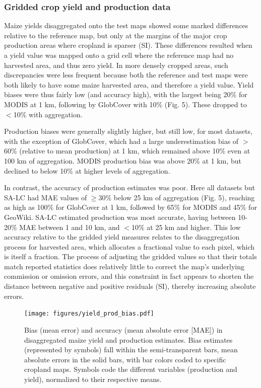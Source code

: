 \documentclass[a4paper]{article}
\begin{document}
\subsubsection*{Gridded crop yield and production data}
Maize yields disaggregated onto the test maps showed some marked differences relative to the reference map, but only at the margins of the major crop production areas where cropland is sparser (SI). These differences resulted when a yield value was mapped onto a grid cell where the reference map had no harvested area, and thus zero yield. In more densely cropped areas, such discrepancies were less frequent because both the reference and test maps were both likely to have some maize harvested area, and therefore a yield value.  Yield biases were thus fairly low (and accuracy high), with the largest being 20\% for MODIS at 1 km, following by GlobCover with 10\% (Fig. 5). These dropped to $<$10\% with aggregation.  

Production biases were generally slightly higher, but still low, for most datasets, with the exception of GlobCover, which had a large underestimation bias of $>$60\% (relative to mean production) at 1 km, which remained above 10\% even at 100 km of aggregation. MODIS production bias was above 20\% at 1 km, but declined to below 10\% at higher levels of aggregation.  

In contrast, the accuracy of production estimates was poor. Here all datasets but SA-LC had MAE values of $\geq$30\% below 25 km of aggregation (Fig. 5), reaching as high as 100\% for GlobCover at 1 km, followed by 65\% for MODIS and 45\% for GeoWiki. SA-LC estimated production was most accurate, having between 10-20\% MAE between 1 and 10 km, and $<$10\% at 25 km and higher.  This low accuracy relative to the gridded yield measures relates to the disaggregation process for harvested area, which allocates a fractional value to each pixel, which is itself a fraction. The process of adjusting the gridded values so that their totals match reported statistics does relatively little to correct the map's underlying commission or omission errors, and this constraint in fact appears to shorten the distance between negative and positive residuals (SI), thereby increasing absolute errors.  

\begin{figure}[!hb]
\centerline{\texttt{[image: figures/yield\_prod\_bias.pdf]}}
\caption{Bias (mean error) and accuracy (mean absolute error [MAE]) in disaggregated maize yield and production estimates. Bias estimates (represented by symbols) fall within the semi-transparent bars, mean absolute errors in the solid bars, with bar colors coded to specific cropland maps.  Symbols code the different variables (production and yield), normalized to their respective means.}
\label{afoto}
\end{figure}
\end{document}
